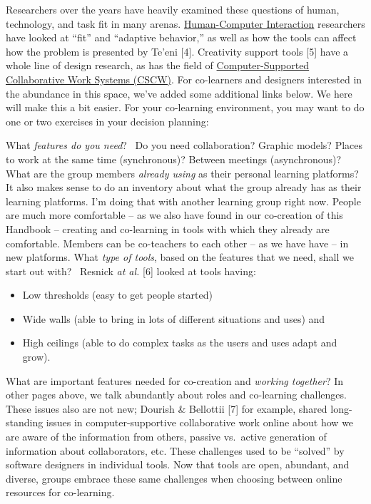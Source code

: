 Researchers over the years have heavily examined these questions of
human, technology, and task fit in many arenas.
\href{http://en.wikipedia.org/wiki/Human-Computer_Interaction}{Human-Computer
Interaction} researchers have looked at ``fit'' and ``adaptive
behavior,'' as well as how the tools can affect how the problem is
presented by Te'eni {{[}4{]}}. Creativity support tools {{[}5{]}} have a
whole line of design research, as has the field of
\href{http://en.wikipedia.org/wiki/Computer-supported_cooperative_work}{Computer-Supported
Collaborative Work Systems (CSCW)}. For co-learners and designers
interested in the abundance in this space, we've added some additional
links below. We here will make this a bit easier. For your co-learning
environment, you may want to do one or two exercises in your decision
planning:

What \emph{features do you need}?~ Do you need collaboration? Graphic
models? Places to work at the same time (synchronous)? Between meetings
(asynchronous)? What are the group members \emph{already using} as their
personal learning platforms? It also makes sense to do an inventory
about what the group already has as their learning platforms. I'm doing
that with another learning group right now. People are much more
comfortable -- as we also have found in our co-creation of this Handbook
-- creating and co-learning in tools with which they already are
comfortable. Members can be co-teachers to each other -- as we have have
-- in new platforms. What \emph{type of tools}, based on the features
that we need, shall we start out with?~ Resnick \emph{at al.} {{[}6{]}}
looked at tools having:

\begin{itemize}
\itemsep1pt\parskip0pt
\item
  Low thresholds (easy to get people started)
\item
  Wide walls (able to bring in lots of different situations and uses)
  and
\item
  High ceilings (able to do complex tasks as the users and uses adapt
  and grow).
\end{itemize}

What are important features needed for co-creation and \emph{working
together}? In other pages above, we talk abundantly about roles and
co-learning challenges. These issues also are not new; Dourish \&
Bellottii {{[}7{]}} for example, shared long-standing issues in
computer-supportive collaborative work online about how we are aware of
the information from others, passive vs.~active generation of
information about collaborators, etc. These challenges used to be
``solved'' by software designers in individual tools. Now that tools are
open, abundant, and diverse, groups embrace these same challenges when
choosing between online resources for co-learning.

